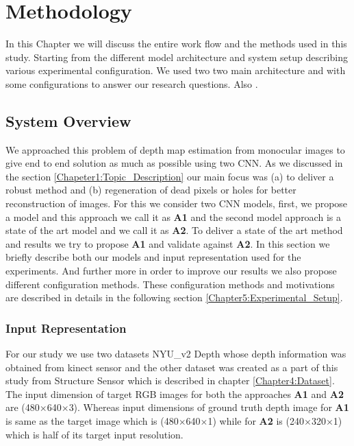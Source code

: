 
\chapter{Methodology}

\label{Chapter5:Methodology} 

In this Chapter we will discuss the entire work flow and the methods used in this study. Starting from the different model architecture and system setup describing various experimental configuration. We used two two main architecture and with some configurations to answer our research questions. Also .


\section{System Overview}
We approached this problem of depth map estimation from monocular images to give end to end solution as much as possible using two CNN. As we discussed in the section \ref{Chapeter1:Topic_Description} our main focus was (a) to deliver a robust method and (b) regeneration of dead pixels or holes for better reconstruction of images. For this we consider two CNN models, first, we propose a model and this approach we call it as \textbf{A1} and the second model approach is a state of the art model and we call it as \textbf{A2}. To deliver a state of the art method and results we try to propose \textbf{A1} and validate against \textbf{A2}. In this section we briefly describe both our models and input representation used for the experiments. And further more in order to improve our results we also propose different configuration methods. These configuration methods and motivations are described in details in the following section \ref{Chapter5:Experimental_Setup}. 


\subsection{Input Representation}
For our study we use two datasets NYU\_v2 Depth \cite{silberman11indoor} whose depth information was obtained from kinect sensor and the other dataset was created as a part of this study from Structure Sensor which is described in chapter \ref{Chapter4:Dataset}. The input dimension of target RGB images for both the approaches \textbf{A1} and \textbf{A2} are (480$\times$640$\times$3). Whereas input dimensions of ground truth depth image for \textbf{A1} is same as the target image  which is (480$\times$640$\times$1) while for \textbf{A2} is  (240$\times$320$\times$1) which is half of its target input resolution.

